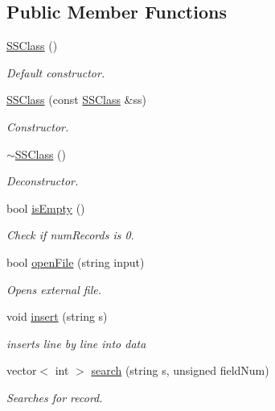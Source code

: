 \subsection*{Public Member Functions}
\begin{DoxyCompactItemize}
\item 
\hyperlink{classSSClass_ab4603d6a236c4fa65f896a1158c0d2ef}{S\+S\+Class} ()
\begin{DoxyCompactList}\small\item\em Default constructor. \end{DoxyCompactList}\item 
\hyperlink{classSSClass_a5801614847b5403b1a5899150acd3b5c}{S\+S\+Class} (const \hyperlink{classSSClass}{S\+S\+Class} \&ss)
\begin{DoxyCompactList}\small\item\em Constructor. \end{DoxyCompactList}\item 
\hyperlink{classSSClass_a6e5abb04de9b90e34cc6422069ff5729}{$\sim$\+S\+S\+Class} ()
\begin{DoxyCompactList}\small\item\em Deconstructor. \end{DoxyCompactList}\item 
bool \hyperlink{classSSClass_afc95611385e4d389818332414d5c491c}{is\+Empty} ()
\begin{DoxyCompactList}\small\item\em Check if num\+Records is 0. \end{DoxyCompactList}\item 
bool \hyperlink{classSSClass_a92e012441608ea36f3013fb3cbea9da8}{open\+File} (string input)
\begin{DoxyCompactList}\small\item\em Opens external file. \end{DoxyCompactList}\item 
void \hyperlink{classSSClass_a45c5585c784bf7c4f823f66426664aea}{insert} (string s)
\begin{DoxyCompactList}\small\item\em inserts line by line into data \end{DoxyCompactList}\item 
vector$<$ int $>$ \hyperlink{classSSClass_a9df3598c000a6a5e9ef994d19196e69f}{search} (string s, unsigned field\+Num)
\begin{DoxyCompactList}\small\item\em Searches for record. \end{DoxyCompactList}\item 

\end{DoxyCompactItemize}
